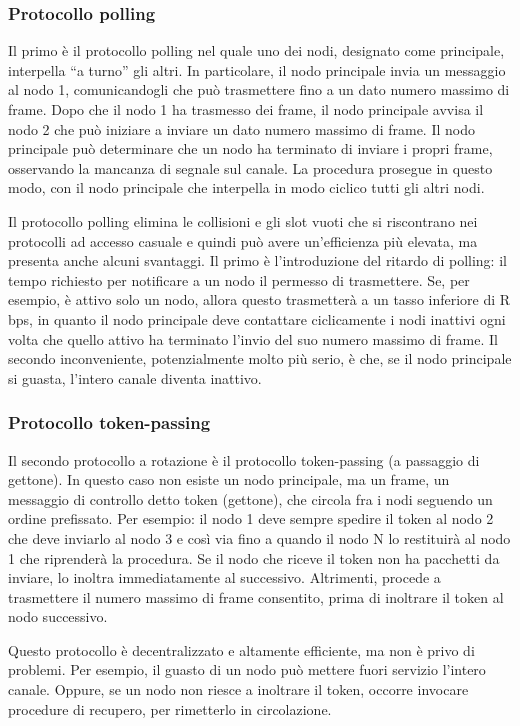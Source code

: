 \subsubsection{Protocollo polling}
Il primo è il protocollo polling nel quale uno dei nodi, designato come principale, interpella “a turno” gli altri. In particolare, il nodo principale invia un messaggio al nodo 1, comunicandogli che può trasmettere fino a un dato numero massimo di frame. Dopo che il nodo 1 ha trasmesso dei frame, il nodo principale avvisa il nodo 2 che può iniziare a inviare un dato numero massimo di frame. Il nodo principale può determinare che un nodo ha terminato di inviare i propri frame, osservando la mancanza di segnale sul canale. La procedura prosegue in questo modo, con il nodo principale che interpella in modo ciclico tutti gli altri nodi.

Il protocollo polling elimina le collisioni e gli slot vuoti che si riscontrano nei protocolli ad accesso casuale e quindi può avere un’efficienza più elevata, ma presenta anche alcuni svantaggi. Il primo è l’introduzione del ritardo di polling: il tempo richiesto per notificare a un nodo il permesso di trasmettere. Se, per esempio, è attivo solo un nodo, allora questo trasmetterà a un tasso inferiore di R bps, in quanto il nodo principale deve contattare ciclicamente i nodi inattivi ogni volta che quello attivo ha terminato l’invio del suo numero massimo di frame. Il secondo inconveniente, potenzialmente molto più serio, è che, se il nodo principale si guasta, l’intero canale diventa inattivo.

\subsubsection{Protocollo token-passing}
Il secondo protocollo a rotazione è il protocollo token-passing (a passaggio di gettone). In questo caso non esiste un nodo principale, ma un frame, un messaggio di controllo detto token (gettone), che circola fra i nodi seguendo un ordine prefissato. Per esempio: il nodo 1 deve sempre spedire il token al nodo 2 che deve inviarlo al nodo 3 e così via fino a quando il nodo N lo restituirà al nodo 1 che riprenderà la procedura. Se il nodo che riceve il token non ha pacchetti da inviare, lo inoltra immediatamente al successivo. Altrimenti, procede a trasmettere il numero massimo di frame consentito, prima di inoltrare il token al nodo successivo. 

Questo protocollo è decentralizzato e altamente efficiente, ma non è privo di problemi. Per esempio, il guasto di un nodo può mettere fuori servizio l’intero canale. Oppure, se un nodo non riesce a inoltrare il token, occorre invocare procedure di recupero, per rimetterlo in circolazione.

